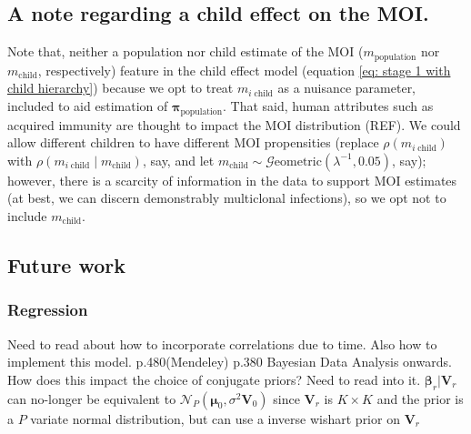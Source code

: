 \documentclass[letterpaper]{article}
\begin{document}
\subsection{A note regarding a child effect on the MOI.}
Note that, neither a population nor child estimate of the MOI ($m_{\text{population}}$ nor $m_{\text{child}}$, respectively) feature in the child effect model (equation \eqref{eq: stage 1 with child hierarchy}) because we opt to treat $m_{i\; \text{child}}$ as a nuisance parameter, included to aid estimation of $\bm{\pi}_{\text{population}}$. That said, human attributes such as acquired immunity are thought to impact the MOI distribution (REF). We could allow different children to have different MOI propensities (replace $\rho\left(m_{i\; \text{child}}\right)$ with $\rho\left(m_{i\; \text{child}} \mid m_{\text{child}}\right)$, say, and let $m_{\text{child}} \sim \mathcal{G}\text{eometric}(\lambda^{-1}, 0.05)$, say); however, there is a scarcity of information in the data  to support MOI estimates (at best, we can discern demonstrably multiclonal infections), so we opt not to include $m_{\text{child}}$.


\subsection{Future work} 

\subsubsection{Regression}



Need to read about how to incorporate correlations due to time. Also how to implement this model. p.480(Mendeley) p.380 Bayesian Data Analysis onwards.
How does this impact the choice of conjugate priors? Need to read into it. $\bm{\beta}_r | \bm{V}_r$ can no-longer be equivalent to $\mathcal{N}_P (\bm{\mu}_0, \sigma^2 \bm{V}_0)$ since $\bm{V}_r$ is $K \times K$ and the prior is a $P$ variate normal distribution, but can use a inverse wishart prior on $\bm{V}_r$
\end{document}
